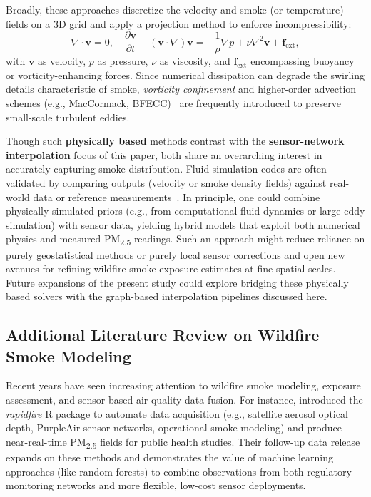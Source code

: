 \documentclass[12pt]{article}                                %
\begin{document}
Broadly, these approaches discretize the velocity and smoke (or temperature) fields on a 3D grid and apply a projection method to enforce incompressibility:
\begin{equation}
\nabla \cdot \mathbf{v} = 0, \quad 
\frac{\partial \mathbf{v}}{\partial t} + (\mathbf{v}\cdot \nabla)\mathbf{v} = -\frac{1}{\rho}\nabla p + \nu \nabla^2\mathbf{v} + \mathbf{f}_{\text{ext}},
\end{equation}
with $\mathbf{v}$ as velocity, $p$ as pressure, $\nu$ as viscosity, and $\mathbf{f}_{\text{ext}}$ encompassing buoyancy or vorticity-enhancing forces. Since numerical dissipation can degrade the swirling details characteristic of smoke, \emph{vorticity confinement} and higher-order advection schemes (e.g., MacCormack, BFECC)~\cite{Selle2008BFECC, MacCormack1971, Fedkiw2001} are frequently introduced to preserve small-scale turbulent eddies. 

Though such \textbf{physically based} methods contrast with the \textbf{sensor-network interpolation} focus of this paper, both share an overarching interest in accurately capturing smoke distribution. Fluid-simulation codes are often validated by comparing outputs (velocity or smoke density fields) against real-world data or reference measurements~\cite{Ishida2020SmokeSuperRes}. In principle, one could combine physically simulated priors (e.g., from computational fluid dynamics or large eddy simulation) with sensor data, yielding hybrid models that exploit both numerical physics and measured PM\textsubscript{2.5} readings. Such an approach might reduce reliance on purely geostatistical methods or purely local sensor corrections and open new avenues for refining wildfire smoke exposure estimates at fine spatial scales. Future expansions of the present study could explore bridging these physically based solvers with the graph-based interpolation pipelines discussed here.

\subsection{Additional Literature Review on Wildfire Smoke Modeling}  %
\label{sec:litreview}
Recent years have seen increasing attention to wildfire smoke modeling, exposure assessment, 
and sensor-based air quality data fusion. For instance, \cite{rapidfireGithub} introduced the 
\emph{rapidfire} R package to automate data acquisition (e.g., satellite aerosol optical depth, 
PurpleAir sensor networks, operational smoke modeling) and produce near-real-time PM\textsubscript{2.5} 
fields for public health studies. Their follow-up data release \cite{rapidfireSupportCode} 
expands on these methods and demonstrates the value of machine learning approaches (like random 
forests) to combine observations from both regulatory monitoring networks and more flexible, 
low-cost sensor deployments.
\end{document}
